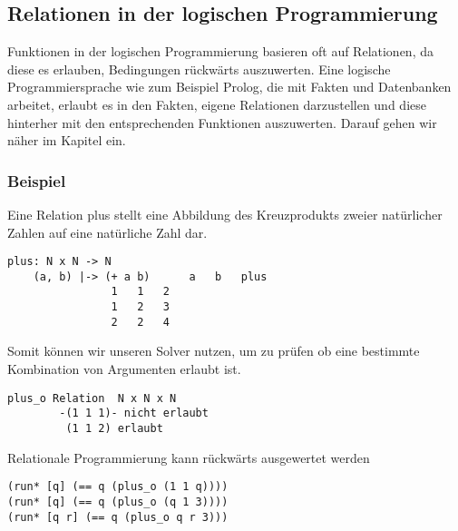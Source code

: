 \subsection{Relationen in der logischen Programmierung}

Funktionen in der logischen Programmierung basieren oft auf Relationen, da diese es erlauben, Bedingungen rückwärts auszuwerten. Eine logische Programmiersprache wie zum Beispiel Prolog, die mit Fakten und Datenbanken arbeitet, erlaubt es in den Fakten, eigene Relationen darzustellen und diese hinterher mit den entsprechenden Funktionen auszuwerten. Darauf gehen wir näher im Kapitel \emph{} ein.

\subsubsection{Beispiel}

Eine Relation plus stellt eine Abbildung des Kreuzprodukts zweier natürlicher Zahlen auf eine natürliche Zahl dar.

\begin{lstlisting}
plus: N x N -> N
    (a, b) |-> (+ a b)		a   b   plus
				1   1   2
				1   2   3
				2   2   4
\end{lstlisting}
Somit können wir unseren Solver nutzen, um zu prüfen ob eine bestimmte Kombination von Argumenten erlaubt ist.

\begin{lstlisting}
plus_o Relation	 N x N x N
		-(1 1 1)- nicht erlaubt
		 (1 1 2) erlaubt
\end{lstlisting}
Relationale Programmierung kann rückwärts ausgewertet werden

\begin{lstlisting}
(run* [q] (== q (plus_o (1 1 q))))
(run* [q] (== q (plus_o (q 1 3))))
(run* [q r] (== q (plus_o q r 3)))
\end{lstlisting}
